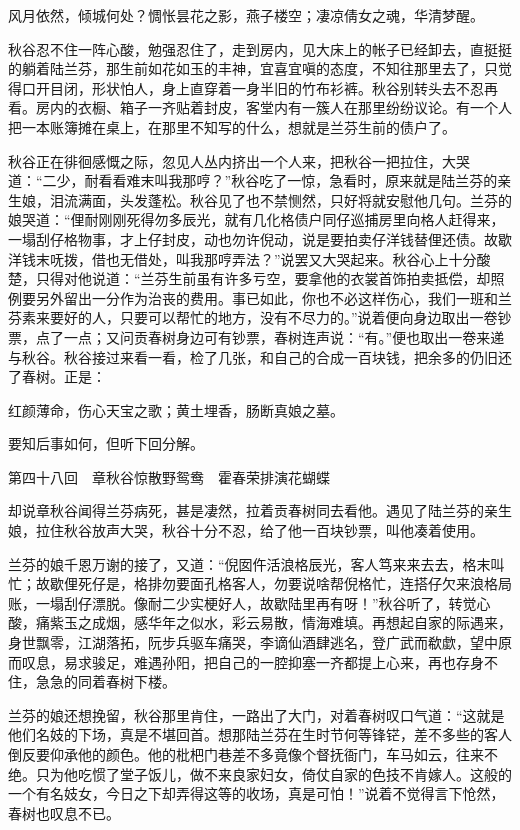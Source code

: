 \documentclass[12pt,UTF8]{ctexbook}
\begin{document}
{{{风月依然，倾城何处？惆怅昙花之影，燕子楼空；凄凉倩女之魂，华清梦醒。

秋谷忍不住一阵心酸，勉强忍住了，走到房内，见大床上的帐子已经卸去，直挺挺的躺着陆兰芬，那生前如花如玉的丰神，宜喜宜嗔的态度，不知往那里去了，只觉得口开目闭，形状怕人，身上直穿着一身半旧的竹布衫裤。秋谷别转头去不忍再看。房内的衣橱、箱子一齐贴着封皮，客堂内有一簇人在那里纷纷议论。有一个人把一本账簿摊在桌上，在那里不知写的什么，想就是兰芬生前的债户了。

秋谷正在徘徊感慨之际，忽见人丛内挤出一个人来，把秋谷一把拉住，大哭道：“二少，耐看看难末叫我那哼？”秋谷吃了一惊，急看时，原来就是陆兰芬的亲生娘，泪流满面，头发蓬松。秋谷见了也不禁恻然，只好将就安慰他几句。兰芬的娘哭道：“俚耐刚刚死得勿多辰光，就有几化格债户同仔巡捕房里向格人赶得来，一塌刮仔格物事，才上仔封皮，动也勿许倪动，说是要拍卖仔洋钱替俚还债。故歇洋钱末呒拨，借也无借处，叫我那哼弄法？”说罢又大哭起来。秋谷心上十分酸楚，只得对他说道：“兰芬生前虽有许多亏空，要拿他的衣裳首饰拍卖抵偿，却照例要另外留出一分作为治丧的费用。事已如此，你也不必这样伤心，我们一班和兰芬素来要好的人，只要可以帮忙的地方，没有不尽力的。”说着便向身边取出一卷钞票，点了一点；又问贡春树身边可有钞票，春树连声说：“有。”便也取出一卷来递与秋谷。秋谷接过来看一看，检了几张，和自己的合成一百块钱，把余多的仍旧还了春树。正是：

红颜薄命，伤心天宝之歌；黄土埋香，肠断真娘之墓。

要知后事如何，但听下回分解。





第四十八回　章秋谷惊散野鸳鸯　霍春荣排演花蝴蝶





却说章秋谷闻得兰芬病死，甚是凄然，拉着贡春树同去看他。遇见了陆兰芬的亲生娘，拉住秋谷放声大哭，秋谷十分不忍，给了他一百块钞票，叫他凑着使用。

兰芬的娘千恩万谢的接了，又道：“倪囡仵活浪格辰光，客人笃来来去去，格末叫忙；故歇俚死仔是，格排勿要面孔格客人，勿要说啥帮倪格忙，连搭仔欠来浪格局账，一塌刮仔漂脱。像耐二少实梗好人，故歇陆里再有呀！”秋谷听了，转觉心酸，痛紫玉之成烟，感华年之似水，彩云易散，情海难填。再想起自家的际遇来，身世飘零，江湖落拓，阮步兵驱车痛哭，李谪仙酒肆逃名，登广武而欷歔，望中原而叹息，易求骏足，难遇孙阳，把自己的一腔抑塞一齐都提上心来，再也存身不住，急急的同着春树下楼。

兰芬的娘还想挽留，秋谷那里肯住，一路出了大门，对着春树叹口气道：“这就是他们名妓的下场，真是不堪回首。想那陆兰芬在生时节何等锋铓，差不多些的客人倒反要仰承他的颜色。他的枇杷门巷差不多竟像个督抚衙门，车马如云，往来不绝。只为他吃惯了堂子饭儿，做不来良家妇女，倚仗自家的色技不肯嫁人。这般的一个有名妓女，今日之下却弄得这等的收场，真是可怕！”说着不觉得言下怆然，春树也叹息不已。

}}}
\end{document}
